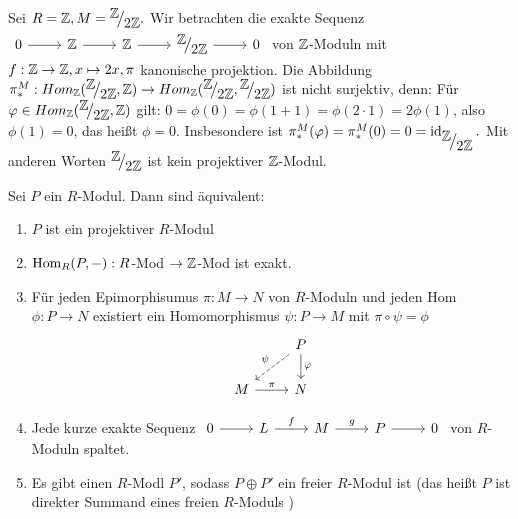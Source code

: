 \begin{bsp}
	Sei $ R = \Z  ,M = \QR{\Z}{2\Z}. $ Wir betrachten die exakte Sequenz  \\ $\begin{tikzcd}
	0  \arrow{r} & \Z \arrow{r} & \Z \arrow{r} & \QR{\Z}{2\Z} \arrow{r} & 0
	\end{tikzcd} $ von $\mathbb{Z}$-Moduln  mit $f: \mathbb{Z} \to \mathbb{Z}, x \mapsto 2x, \pi $ kanonische projektion. Die Abbildung $ \pi_{*}^{M}: Hom_{\Z}(\QR{\Z}{2\Z}, \Z) \to Hom_{\Z}(\QR{\Z}{2\Z},\QR{\Z}{2\Z} ) $ ist nicht surjektiv, denn:  Für $ \phi \in Hom_{\Z}(\QR{\Z}{2\Z}, \Z) $ gilt: $0 = \phi(0) = \phi( 1 +1) = \phi(2\cdot 1) = 2\phi(1)$, also $ \phi(1)= 0$, das heißt $\phi = 0$. Insbesondere ist $\pi_{*}^{M}(\phi) = \pi_{*}^{M}(0) =0 = \id_{\QR{\Z}{2\Z}} . $ Mit anderen Worten $\QR{\Z}{2\Z}$ ist kein projektiver $\mathbb{Z}$-Modul. 
\end{bsp}
\begin{sa}
	Sei $P$ ein $R$-Modul. Dann sind äquivalent:
	\begin{enumerate} [label= \roman*)]
		\item $P$ ist ein projektiver $R$-Modul 
		\item $\operatorname{Hom}_R(P,-): R$-Mod $\to \mathbb{Z}$-Mod ist exakt.
		\item Für jeden Epimorphisumus $ \pi: M \to N $ von $R$-Moduln und jeden Hom $ \phi: P \to N $ existiert ein Homomorphismus $\psi: P \to M $ mit $ \pi \circ \psi = \phi$
		$$\begin{tikzcd}
		& P \arrow[swap, dashed]{dl}{\psi} \arrow{d}{\phi} \\
		M \arrow{r}{\pi} & N
		\end{tikzcd}$$
		\item Jede kurze exakte Sequenz $\begin{tikzcd}
		0  \arrow{r} & L \arrow{r}{f} & M \arrow{r}{g} & P \arrow{r} & 0
		\end{tikzcd} $ von $R$-Moduln spaltet.
		\item Es gibt einen $R$-Modl $P'$, sodass $ P \oplus P' $ ein freier $R$-Modul ist (das heißt $P$ ist direkter Summand eines freien $R$-Moduls )
	\end{enumerate}
\end{sa}
